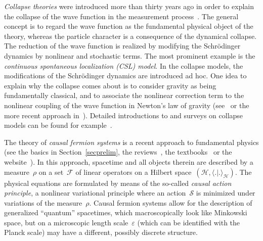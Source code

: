 \documentclass[reqno,11pt]{amsart}
\numberwithin{equation}{section}
\newcommand{\la}{\langle}
\newcommand{\ra}{\rangle}
\newcommand{\1}{\mathds{1}}
\newcommand{\Sact}{{\mathcal{S}}}
\renewcommand{\H}{\mathscr{H}}
\newcommand{\F}{{\mathscr{F}}}
\begin{document}
{\em{Collapse theories}} were introduced more than thirty years ago
in order to explain the collapse of the wave function in the measurement process~\cite{karolyhazy,
karolyhazy2, ghirardi1, gisin, pearle0, ghirardi-pearle-rimini, ghirardi2}.
The general concept is to regard the wave function as the fundamental physical object of the theory,
whereas the particle character is a consequence of the dynamical collapse.
The reduction of the wave function is realized by modifying the Schr\"odinger dynamics by nonlinear
and stochastic terms. The most prominent example is the
{\em{continuous spontaneous localization (CSL) model}}.
In the collapse models, the modifications of the Schr\"odinger dynamics are introduced
ad hoc. One idea to explain why the collapse comes about is to consider gravity as
being fundamentally classical, and to associate the nonlinear correction term to
the nonlinear coupling of the wave function in Newton's law of gravity
(see~\cite{diosi1, diosi2, penrose-collapse, penrose-collapse2} or the more recent approach
in~\cite{lulli-marciano-psciccia}). Detailed introductions to and surveys on
collapse models can be found for example~\cite{ bassi-ghirardi, pearle, bassi, bassi-duerr-hinrichs}.

The theory of {\em{causal fermion systems}} is a recent approach to fundamental physics
(see the basics in Section~\ref{secprelim}, the reviews~\cite{dice2014, review}, the textbooks~\cite{cfs, intro}
or the website~\cite{cfsweblink}).
In this approach, spacetime and all objects therein are described by a measure~$\rho$
on a set~$\F$ of linear operators on a Hilbert space~$(\H, \la .|. \ra_\H)$. 
The physical equations are formulated by means of the so-called {\em{causal action principle}},
a nonlinear variational principle where an action~$\Sact$ is minimized under variations of the measure~$\rho$.
Causal fermion systems allow for the description of generalized ``quantum'' spacetimes,
which macroscopically look like Minkowski space, but on a microscopic length scale~$\varepsilon$
(which can be identified with the Planck scale) may have a different, possibly discrete structure.
\end{document}
